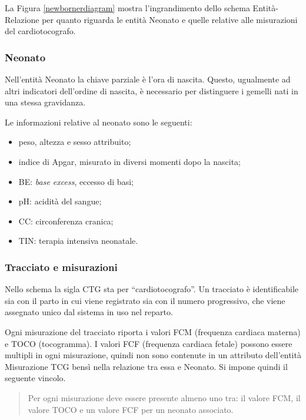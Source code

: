 La Figura \ref{newbornerdiagram} mostra l'ingrandimento dello schema Entità-Relazione per quanto riguarda le entità Neonato e quelle relative alle misurazioni del cardiotocografo.

\subsubsection{Neonato}

Nell'entità Neonato la chiave parziale è l'ora di nascita.
Questo, ugualmente ad altri indicatori dell'ordine di nascita, è necessario per distinguere i gemelli nati in una stessa gravidanza.

Le informazioni relative al neonato sono le seguenti:
\begin{itemize}
\item peso, altezza e sesso attribuito;
\item indice di Apgar, misurato in diversi momenti dopo la nascita;
\item BE: \emph{base excess}, eccesso di basi;
\item pH: acidità del sangue;
\item CC: circonferenza cranica;
\item TIN: terapia intensiva neonatale.
\end{itemize}

\subsubsection{Tracciato e misurazioni}

Nello schema la sigla CTG sta per \enquote{cardiotocografo}.
Un tracciato è identificabile sia con il parto in cui viene registrato sia con il numero progressivo, che viene assegnato unico dal sistema in uso nel reparto.

Ogni misurazione del tracciato riporta i valori FCM (frequenza cardiaca materna) e TOCO (tocogramma).
I valori FCF (frequenza cardiaca fetale) possono essere multipli in ogni misurazione, quindi non sono contenute in un attributo dell'entità Misurazione TCG bensì nella relazione tra essa e Neonato.
Si impone quindi il seguente vincolo.
\begin{quote}
Per ogni misurazione deve essere presente almeno uno tra: il valore FCM, il valore TOCO e un valore FCF per un neonato associato.
\end{quote}